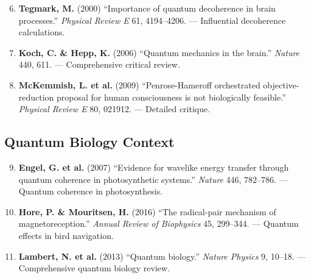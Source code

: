 \begin{enumerate}
\setcounter{enumi}{5}
\item \textbf{Tegmark, M.} (2000) ``Importance of quantum decoherence in brain processes.'' \textit{Physical Review E} 61, 4194--4206. --- Influential decoherence calculations.

\item \textbf{Koch, C. \& Hepp, K.} (2006) ``Quantum mechanics in the brain.'' \textit{Nature} 440, 611. --- Comprehensive critical review.

\item \textbf{McKemmish, L. et al.} (2009) ``Penrose-Hameroff orchestrated objective-reduction proposal for human consciousness is not biologically feasible.'' \textit{Physical Review E} 80, 021912. --- Detailed critique.
\end{enumerate}

\subsection{Quantum Biology Context}

\begin{enumerate}
\setcounter{enumi}{8}
\item \textbf{Engel, G. et al.} (2007) ``Evidence for wavelike energy transfer through quantum coherence in photosynthetic systems.'' \textit{Nature} 446, 782--786. --- Quantum coherence in photosynthesis.

\item \textbf{Hore, P. \& Mouritsen, H.} (2016) ``The radical-pair mechanism of magnetoreception.'' \textit{Annual Review of Biophysics} 45, 299--344. --- Quantum effects in bird navigation.

\item \textbf{Lambert, N. et al.} (2013) ``Quantum biology.'' \textit{Nature Physics} 9, 10--18. --- Comprehensive quantum biology review.
\end{enumerate}
